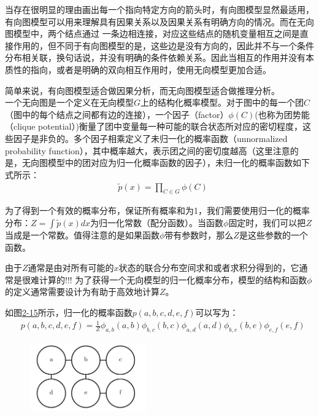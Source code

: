 当存在很明显的理由画出每一个指向特定方向的箭头时，有向图模型显然最适用，有向图模型可以用来理解具有因果关系以及因果关系有明确方向的情况。而在无向图模型中，两个结点通过
一条边相连接，对应这些结点的随机变量相互之间是直接作用的，但不同于有向图模型的是，这些边是没有方向的，因此并不与一个条件分布相关联，换句话说，并没有明确的条件依赖关系。因此当相互的作用并没有本质性的指向，或者是明确的双向相互作用时，使用无向模型更加合适。

简单来说，有向图模型适合做因果分析，而无向图模型适合做推理分析。\\

一个无向图是一个定义在无向模型$G$上的结构化概率模型。对于图中的每一个团$C$（图中的每个结点之间都有边的连接），一个因子（factor）$\phi(C)$(也称为团势能（clique potential）)衡量了团中变量每一种可能的联合状态所对应的密切程度，这些因子是非负的。多个因子相乘定义了未归一化的概率函数（unnormalized probability function），其中概率越大，表示团之间的密切度越高（这里注意的是，无向图模型中的团对应为归一化概率函数的因子），未归一化的概率函数如下式所示：
\begin{align}
&\tilde p(x) = \prod_{C \in G} \phi(C)
\end{align}

为了得到一个有效的概率分布，保证所有概率和为1，我们需要使用归一化的概率分布：$Z = \int \tilde p(x)dx$为归一化常数（配分函数）。当函数$\phi$固定时，我们可以把$Z$当成是一个常数。值得注意的是如果函数$\phi$带有参数时，那么$Z$是这些参数的一个函数。

由于$Z$通常是由对所有可能的$x$状态的联合分布空间求和或者求积分得到的，它通常是很难计算的!!! 为了获得一个无向模型的归一化概率分布，模型的结构和函数$\phi$的定义通常需要设计为有助于高效地计算$Z$。

如图\href{fig:2-15}{2-15}所示，归一化的概率函数$p(a,b,c,d,e,f)$可以写为：
\begin{align}
&p(a,b,c,d,e,f) = \frac{1}{Z} \phi_{a,b}(a,b)\phi_{b,c}(b,c)\phi_{a,d}(a,d)\phi_{b,e}(b,e)\phi_{e,f}(e,f)
\end{align}

\begin{figure}
  \centering
  \includegraphics[width=2in]{figure/example/DAG.jpg}
  \caption{}
  \label{fig:2-15}
\end{figure}

